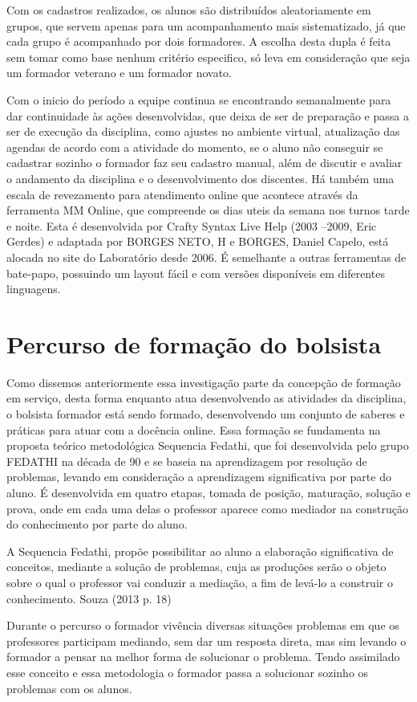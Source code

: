Com os cadastros realizados, os alunos são distribuídos aleatoriamente em grupos, que servem apenas para um acompanhamento mais sistematizado, já que cada grupo é acompanhado por dois formadores. A escolha desta dupla é feita sem tomar como base nenhum critério especifico, só leva em consideração que seja um formador veterano e um formador novato.

Com o inicio do período a equipe continua se encontrando semanalmente para dar continuidade às ações desenvolvidas, que deixa de ser de preparação e passa a ser de execução da disciplina, como ajustes no ambiente virtual, atualização das agendas de acordo com a atividade do momento, se o aluno não conseguir se cadastrar sozinho o formador faz seu cadastro manual, além de discutir e avaliar o andamento da disciplina e o desenvolvimento dos discentes. Há também uma escala de revezamento para atendimento online que acontece através da ferramenta MM Online, que compreende os dias uteis da semana nos turnos tarde e noite. Esta é desenvolvida por Crafty Syntax Live Help (2003 –2009, Eric Gerdes) e adaptada por BORGES NETO, H e BORGES, Daniel Capelo, está alocada no site do Laboratório desde 2006. É semelhante a outras ferramentas de bate-papo, possuindo um layout fácil e com versões disponíveis em diferentes linguagens. 

\section{Percurso de formação do bolsista}

Como dissemos anteriormente essa investigação parte da concepção de formação em serviço, desta forma enquanto atua desenvolvendo as atividades da disciplina, o bolsista formador está sendo formado, desenvolvendo um conjunto de saberes e práticas para atuar com a docência online. Essa formação se fundamenta na proposta teórico metodológica Sequencia Fedathi, que foi desenvolvida pelo grupo FEDATHI na década de 90 e se baseia na aprendizagem por resolução de problemas, levando em consideração a aprendizagem significativa por parte do aluno. É desenvolvida em quatro etapas, tomada de posição, maturação, solução e prova, onde em cada uma delas o professor aparece como mediador na construção do conhecimento por parte do aluno. 

\begin{citacao}
A Sequencia Fedathi, propõe possibilitar ao aluno a elaboração significativa de conceitos, mediante a solução de problemas, cuja as produções serão o objeto sobre o qual o professor vai conduzir a mediação, a fim de levá-lo a construir o conhecimento. Souza (2013 p. 18) 
\end{citacao}

Durante o percurso o formador vivência diversas situações problemas em que os professores participam mediando, sem dar um resposta direta, mas sim levando o formador a pensar na melhor forma de solucionar o problema. Tendo assimilado esse conceito e essa metodologia o formador passa a solucionar sozinho os problemas com os alunos.


